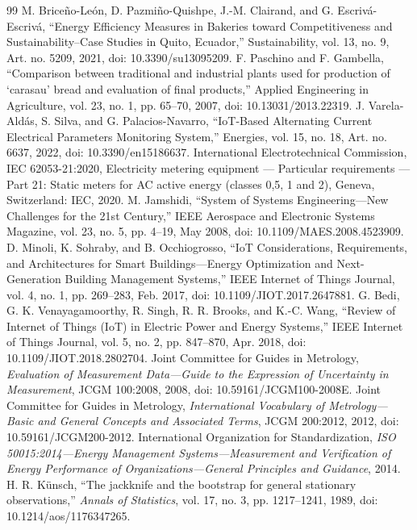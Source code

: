 \documentclass[technologies,article,submit,pdftex,moreauthors]{Definitions/mdpi}
\begin{document}
\begin{thebibliography}{99}
 M. Briceño-León, D. Pazmiño-Quishpe, J.-M. Clairand, and G. Escrivá-Escrivá, ``Energy Efficiency Measures in Bakeries toward Competitiveness and Sustainability--Case Studies in Quito, Ecuador,'' Sustainability, vol. 13, no. 9, Art. no. 5209, 2021, doi: 10.3390/su13095209.
 F. Paschino and F. Gambella, ``Comparison between traditional and industrial plants used for production of `carasau' bread and evaluation of final products,'' Applied Engineering in Agriculture, vol. 23, no. 1, pp. 65--70, 2007, doi: 10.13031/2013.22319.
 J. Varela-Aldás, S. Silva, and G. Palacios-Navarro, ``IoT-Based Alternating Current Electrical Parameters Monitoring System,'' Energies, vol. 15, no. 18, Art. no. 6637, 2022, doi: 10.3390/en15186637.
 International Electrotechnical Commission, IEC 62053-21:2020, Electricity metering equipment --- Particular requirements --- Part 21: Static meters for AC active energy (classes 0,5, 1 and 2), Geneva, Switzerland: IEC, 2020.
 M. Jamshidi, ``System of Systems Engineering---New Challenges for the 21st Century,'' IEEE Aerospace and Electronic Systems Magazine, vol. 23, no. 5, pp. 4--19, May 2008, doi: 10.1109/MAES.2008.4523909.
 D. Minoli, K. Sohraby, and B. Occhiogrosso, ``IoT Considerations, Requirements, and Architectures for Smart Buildings---Energy Optimization and Next-Generation Building Management Systems,'' IEEE Internet of Things Journal, vol. 4, no. 1, pp. 269--283, Feb. 2017, doi: 10.1109/JIOT.2017.2647881.
 G. Bedi, G. K. Venayagamoorthy, R. Singh, R. R. Brooks, and K.-C. Wang, ``Review of Internet of Things (IoT) in Electric Power and Energy Systems,'' IEEE Internet of Things Journal, vol. 5, no. 2, pp. 847--870, Apr. 2018, doi: 10.1109/JIOT.2018.2802704.
 Joint Committee for Guides in Metrology, \emph{Evaluation of Measurement Data---Guide to the Expression of Uncertainty in Measurement}, JCGM 100:2008, 2008, doi: 10.59161/JCGM100-2008E.
 Joint Committee for Guides in Metrology, \emph{International Vocabulary of Metrology---Basic and General Concepts and Associated Terms}, JCGM 200:2012, 2012, doi: 10.59161/JCGM200-2012.
 International Organization for Standardization, \emph{ISO 50015:2014---Energy Management Systems---Measurement and Verification of Energy Performance of Organizations---General Principles and Guidance}, 2014.
 H. R. K\"unsch, ``The jackknife and the bootstrap for general stationary observations,'' \emph{Annals of Statistics}, vol. 17, no. 3, pp. 1217--1241, 1989, doi: 10.1214/aos/1176347265.

\end{thebibliography}
\end{document}

